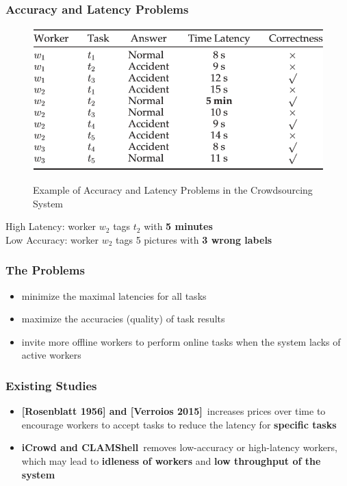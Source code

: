\documentclass[UTF8]{beamer}
\begin{document}
\begin{frame}
    \frametitle{Accuracy and Latency Problems}
    \begin{figure}
        \includegraphics[width= 0.8\linewidth]{ACEXP.png}
        \label{fig:ACEXP}
        \caption{Example of Accuracy and Latency Problems in the Crowdsourcing System}
     \end{figure}
     \begin{center}
         High Latency: worker $w_2$ tags $t_2$ with \textbf{5 minutes}\\
         Low Accuracy: worker $w_2$ tags 5 pictures with \textbf{3 wrong labels}
     \end{center}
\end{frame}

\begin{frame}
    \frametitle{The Problems}
    \begin{itemize}
        \item minimize the maximal latencies for all tasks
        \item maximize the accuracies (quality) of task results
        \item invite more offline workers to perform online tasks 
        when the system lacks of active workers
    \end{itemize}
\end{frame}

\begin{frame}
    \frametitle{Existing Studies}
    \begin{itemize}
        \item \textbf{[Rosenblatt 1956] and [Verroios 2015]}\ increases 
        prices over time to encourage workers to accept tasks
        to reduce the latency for \textbf{speciﬁc tasks}
        \item \textbf{iCrowd and CLAMShell}\ removes 
        low-accuracy or high-latency workers, which may lead 
        to \textbf{idleness of workers} and \textbf{low throughput of the 
        system}
    \end{itemize}
\end{frame}
\end{document}
